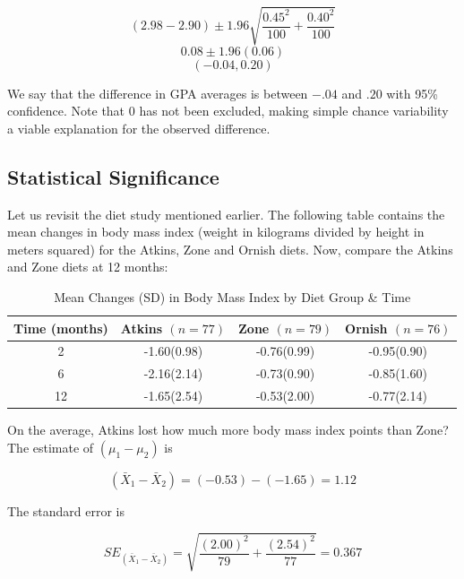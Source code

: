 \documentclass[11pt, chapterprefix=true]{scrbook}\usepackage[]{graphicx}\usepackage[]{color}
\begin{document}
\begin{equation*}
  (2.98 - 2.90) \pm 1.96 \sqrt{\frac{0.45^2}{100} + \frac{0.40^2}{100}}
\end{equation*}
\begin{equation*}
  0.08 \pm 1.96 (0.06)
\end{equation*}
\begin{equation*}
  (-0.04, 0.20)
\end{equation*}

We say that the difference in GPA averages is between $-.04$ and $.20$ with 95\% confidence.  Note that 0 has not been excluded, making simple chance variability a viable explanation for the observed difference. 

\subsection{Statistical Significance}

Let us revisit the diet study mentioned earlier.  The following table contains the mean changes in body mass index (weight in kilograms divided by height in meters squared) for the Atkins, Zone and Ornish diets. Now, compare the Atkins and Zone diets at 12 months:

\begin{table}[ht]
\centering
\caption{Mean Changes (SD) in Body Mass Index by Diet Group \& Time}
\begin{tabular}{@{} cccc @{}} \hline
Time (months) & Atkins $(n = 77)$ & Zone $(n = 79)$ & Ornish $(n = 76)$ \\ \hline
2 & -1.60(0.98) & -0.76(0.99) & -0.95(0.90) \\
6 & -2.16(2.14) & -0.73(0.90) & -0.85(1.60) \\
12 & -1.65(2.54) & -0.53(2.00) & -0.77(2.14) \\ \hline
\end{tabular}
\end{table}

On the average, Atkins lost how much more body mass index points than Zone?  The estimate of $(\mu_1 - \mu_2)$ is

\begin{equation*}
  (\bar{X}_1 - \bar{X}_2) = (-0.53) - (-1.65) = 1.12
\end{equation*}

The standard error is 

\begin{equation*}
  SE_{(\bar{X}_1 - \bar{X}_2)} = \sqrt{ \frac{(2.00)^2}{79} + \frac{(2.54)^2}{77}} = 0.367
\end{equation*}
\end{document}

